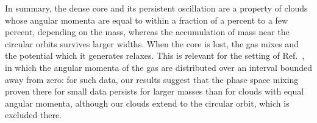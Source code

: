 In summary, the dense core and its persistent oscillation are a property of clouds whose angular momenta are equal to within a fraction of a percent to a few percent, depending on the mass, whereas the accumulation of mass near the circular orbits survives larger widths. When the core is lost, the gas mixes and the potential which it generates relaxes. This is relevant for the setting of Ref.~\cite{sCjL26}, in which the angular momenta of the gas are distributed over an interval bounded away from zero: for such data, our results suggest that the phase space mixing proven there for small data persists for larger masses than for clouds with equal angular momenta, although our clouds extend to the circular orbit, which is excluded there.
